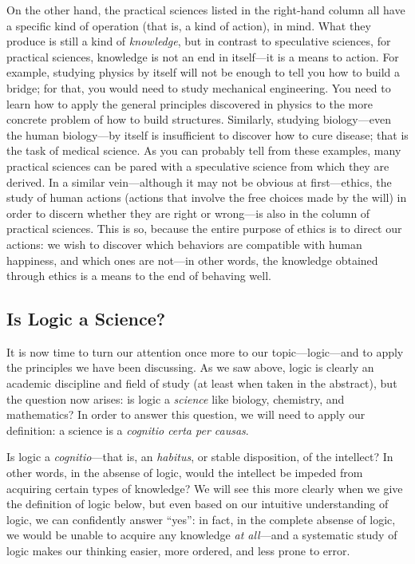\documentclass[article,12pt,a4paper,oneside]{memoir}
\begin{document}
    On the other hand, the practical sciences listed in the right-hand
    column all have a specific kind of operation (that is, a kind of
    action), in mind. What they produce is still a kind of
    \emph{knowledge}, but in contrast to speculative sciences, for
    practical sciences, knowledge is not an end in itself---it is a
    means to action. For example, studying physics by itself will not be
    enough to tell you how to build a bridge; for that, you would need
    to study mechanical engineering. You need to learn how to apply the
    general principles discovered in physics to the more concrete
    problem of how to build structures. Similarly, studying
    biology---even the human biology---by itself is insufficient to
    discover how to cure disease; that is the task of medical science.
    As you can probably tell from these examples, many practical
    sciences can be pared with a speculative science from which they are
    derived. In a similar vein---although it may not be obvious at
    first---ethics, the study of human actions (actions that involve the
    free choices made by the will) in order to discern whether they are
    right or wrong---is also in the column of practical sciences. This
    is so, because the entire purpose of ethics is to direct our
    actions: we wish to discover which behaviors are compatible with
    human happiness, and which ones are not---in other words, the
    knowledge obtained through ethics is a means to the end of behaving
    well.

    \hypertarget{is-logic-a-science}{%
    \subsection{Is Logic a Science?}\label{is-logic-a-science}}

    It is now time to turn our attention once more to our
    topic---logic---and to apply the principles we have been discussing.
    As we saw above, logic is clearly an academic discipline and field
    of study (at least when taken in the abstract), but the question now
    arises: is logic a \emph{science} like biology, chemistry, and
    mathematics? In order to answer this question, we will need to apply
    our definition: a science is a \emph{cognitio certa per causas}.

    Is logic a \emph{cognitio}---that is, an \emph{habitus}, or stable
    disposition, of the intellect? In other words, in the absense of
    logic, would the intellect be impeded from acquiring certain types
    of knowledge? We will see this more clearly when we give the
    definition of logic below, but even based on our intuitive
    understanding of logic, we can confidently answer ``yes'': in fact,
    in the complete absense of logic, we would be unable to acquire any
    knowledge \emph{at all}---and a systematic study of logic makes our
    thinking easier, more ordered, and less prone to error.
\end{document}

